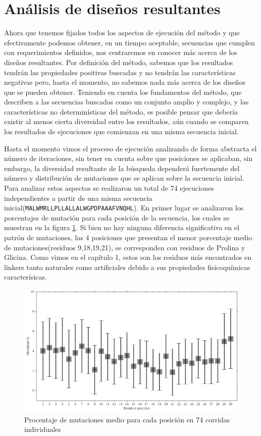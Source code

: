 \section{Análisis de diseños resultantes}

Ahora que tenemos fijados todos los aspectos de ejecución del método y que efectivamente podemos obtener, en un tiempo aceptable, secuencias que cumplen con requerimientos definidos, nos centraremos en 
conocer más acerca de los diseños resultantes.
Por definición del método, sabemos que los resultados tendrán las propiedades positivas buscadas y no tendrán las características negativas pero, hasta el momento, no sabemos nada más acerca de los diseños que se pueden obtener.
Teniendo en cuenta los fundamentos del método, que describen a las secuencias buscadas como un conjunto amplio y complejo, y las características no determinísticas del método,
es posible pensar que debería existir al menos cierta diversidad entre los resultados, aún cuando se comparen los resultados de ejecuciones que comienzan en una misma secuencia inicial.

Hasta el momento vimos el proceso de ejecución analizando de forma abstracta el número de iteraciones, sin tener en cuenta sobre que posiciones se aplicaban,
sin embargo, la diversidad resultante de la búsqueda dependerá fuertemente del número y distribución de mutaciones que se aplican sobre la secuencia inicial.
Para analizar estos aspectos se realizaron un total de 74 ejecuciones independientes a partir de una misma secuencia inicial(\texttt{MALWMRLLPLLALLALWGPDPAAAFVNQHL}).
En primer lugar se analizaron los porcentajes de mutación para cada posición de la secuencia, los cuales se muestran en la figura \ref{fig:mutationPerSite}.
Si bien no hay ninguna diferencia significativa en el patrón de mutaciones, las 4 posiciones que presentan el menor porcentaje medio de mutaciones(residuos 9,18,19,21),
se corresponden con residuos de Prolina y Glicina.
Como vimos en el capítulo 1, estos son los residuos más encontrados en linkers tanto naturales como artificiales debido a sus propiedades fisicoquímicas caracterísicas.

\begin{figure}[htbp]
\includegraphics[width=\textwidth]{img/resultados/mutationsPerPosition.png}
\caption{Procentaje de mutaciones medio para cada posición en 74 corridas individuales}
\label{fig:mutationPerSite}
\end{figure}


